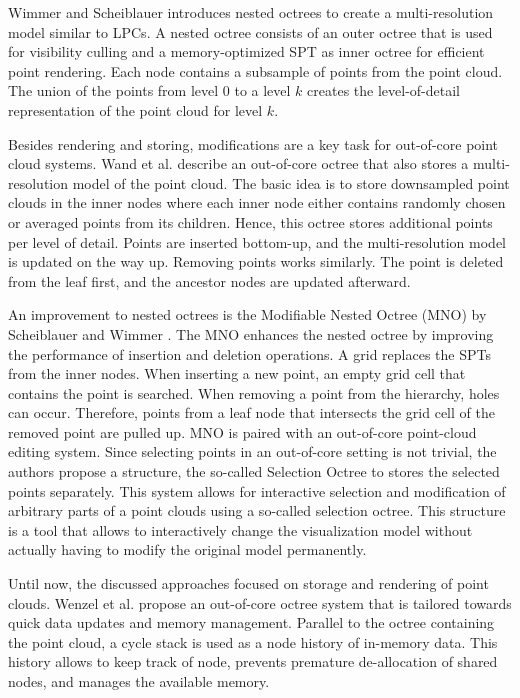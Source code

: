 \par

Wimmer and Scheiblauer \cite{wimmer2006instant} introduces nested octrees to create a multi-resolution model similar to LPCs. A nested octree consists of an outer octree that is used for visibility culling and a memory-optimized SPT as inner octree for efficient point rendering. Each node contains a subsample of points from the point cloud. The union of the points from level 0 to a level $k$ creates the level-of-detail representation of the point cloud for level $k$. 

\par

Besides rendering and storing, modifications are a key task for out-of-core point cloud systems. Wand et al. \cite{wand2007interactive} describe an out-of-core octree that also stores a multi-resolution model of the point cloud. The basic idea is to store downsampled point clouds in the inner nodes where each inner node either contains randomly chosen or averaged points from its children. Hence, this octree stores additional points per level of detail. Points are inserted bottom-up, and the multi-resolution model is updated on the way up. Removing points works similarly. The point is deleted from the leaf first, and the ancestor nodes are updated afterward. 

\par

An improvement to nested octrees is the Modifiable Nested Octree (MNO) by Scheiblauer and Wimmer \cite{scheiblauer2011out}. The MNO enhances the nested octree by improving the performance of insertion and deletion operations. A grid replaces the SPTs from the inner nodes. When inserting a new point, an empty grid cell that contains the point is searched. When removing a point from the hierarchy, holes can occur. Therefore, points from a leaf node that intersects the grid cell of the removed point are pulled up. MNO is paired with an out-of-core point-cloud editing system. Since selecting points in an out-of-core setting is not trivial, the authors propose a structure, the so-called Selection Octree to stores the selected points separately. This system allows for interactive selection and modification of arbitrary parts of a point clouds using a so-called selection octree. This structure is a tool that allows to interactively change the visualization model without actually having to modify the original model permanently. 

\par

Until now, the discussed approaches focused on storage and rendering of point clouds. Wenzel et al. \cite{wenzel2014out} propose an out-of-core octree system that is tailored towards quick data updates and memory management. Parallel to the octree containing the point cloud, a cycle stack is used as a node history of in-memory data. This history allows to keep track of node, prevents premature de-allocation of shared nodes, and manages the available memory. 

